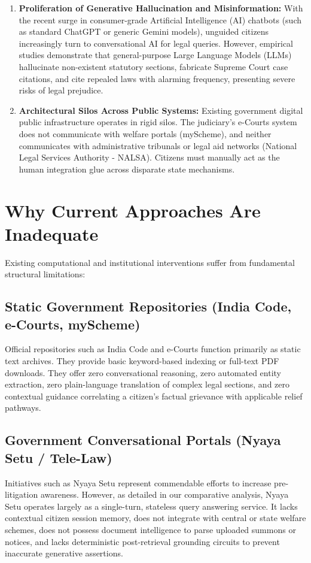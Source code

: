 \begin{enumerate}
    \item \textbf{Proliferation of Generative Hallucination and Misinformation:} With the recent surge in consumer-grade Artificial Intelligence (AI) chatbots (such as standard ChatGPT or generic Gemini models), unguided citizens increasingly turn to conversational AI for legal queries. However, empirical studies demonstrate that general-purpose Large Language Models (LLMs) hallucinate non-existent statutory sections, fabricate Supreme Court case citations, and cite repealed laws with alarming frequency, presenting severe risks of legal prejudice.
    \item \textbf{Architectural Silos Across Public Systems:} Existing government digital public infrastructure operates in rigid silos. The judiciary's e-Courts system does not communicate with welfare portals (myScheme), and neither communicates with administrative tribunals or legal aid networks (National Legal Services Authority - NALSA). Citizens must manually act as the human integration glue across disparate state mechanisms.
\end{enumerate}

\section{Why Current Approaches Are Inadequate}
\label{sec:inadequacy}
Existing computational and institutional interventions suffer from fundamental structural limitations:

\subsection{Static Government Repositories (India Code, e-Courts, myScheme)}
Official repositories such as India Code and e-Courts function primarily as static text archives. They provide basic keyword-based indexing or full-text PDF downloads. They offer zero conversational reasoning, zero automated entity extraction, zero plain-language translation of complex legal sections, and zero contextual guidance correlating a citizen's factual grievance with applicable relief pathways.

\subsection{Government Conversational Portals (Nyaya Setu / Tele-Law)}
Initiatives such as Nyaya Setu represent commendable efforts to increase pre-litigation awareness. However, as detailed in our comparative analysis, Nyaya Setu operates largely as a single-turn, stateless query answering service. It lacks contextual citizen session memory, does not integrate with central or state welfare schemes, does not possess document intelligence to parse uploaded summons or notices, and lacks deterministic post-retrieval grounding circuits to prevent inaccurate generative assertions.

